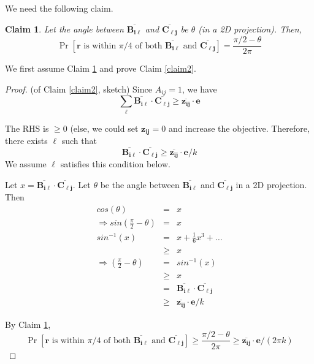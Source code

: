 \documentclass[11pt]{article}
\newtheorem{claim}[lemma]{Claim} %
\begin{document}
We need the following claim.
\begin{claim}
\label{claim3}
Let the angle between $\overline{\mathbf{B_{i\ell}}}$ and $\overline{\mathbf{C_{\ell j}}}$
be $\theta$ (in a 2D projection). Then, 
\[
\Pr[\mathbf{r} \mbox{ is within $\pi/4$ of both $\overline{\mathbf{B_{i\ell}}}$ and $\overline{\mathbf{C_{\ell j}}}$}] = \frac{\pi/2 - \theta}{2\pi}
\]
\end{claim}

We first assume Claim \ref{claim3} and prove Claim \ref{claim2}.
\begin{proof} (of Claim \ref{claim2}, sketch)
Since $A_{ij}=1$, we have
\[
 \sum_{\ell} \overline{\mathbf{B_{i\ell}}}\cdot\overline{\mathbf{C_{\ell j}}} \geq \overline{\mathbf{z_{ij}}}\cdot\mathbf{e}
\]

The RHS is $\geq 0$ (else, we could set $\mathbf{z_{ij}}=0$ and increase the
objective.
Therefore, there exists $\ell$ such that
\[
\overline{\mathbf{B_{i\ell}}}\cdot\overline{\mathbf{C_{\ell j}}} \geq \overline{\mathbf{z_{ij}}}\cdot\mathbf{e}/k
\]
We assume $\ell$ satisfies this condition below.

Let $x=\overline{\mathbf{B_{i\ell}}}\cdot \overline{\mathbf{C_{\ell j}}}$.
Let $\theta$ be the angle between $\overline{\mathbf{B_{i\ell}}}$ and $\overline{\mathbf{C_{\ell j}}}$
in a 2D projection. Then
\begin{eqnarray*}
cos(\theta) &=& x\\
\Rightarrow sin(\frac{\pi}{2} - \theta) &=& x\\
sin^{-1}(x) &=& x + \frac{1}{6}x^3 + \ldots\\
 &\geq& x\\
\Rightarrow (\frac{\pi}{2} - \theta) &=& sin^{-1}(x)\\
&\geq& x\\
&=& \overline{\mathbf{B_{i\ell}}}\cdot \overline{\mathbf{C_{\ell j}}}\\
&\geq& \overline{\mathbf{z_{ij}}}\cdot\mathbf{e}/k
\end{eqnarray*}

By Claim \ref{claim3},
\[
\Pr[\mathbf{r} \mbox{ is within $\pi/4$ of both $\overline{\mathbf{B_{i\ell}}}$ and $\overline{\mathbf{C_{\ell j}}}$}] \geq 
\frac{\pi/2 - \theta}{2\pi} \geq \overline{\mathbf{z_{ij}}}\cdot\mathbf{e}/(2\pi k)
\]
\end{proof}
\end{document}
